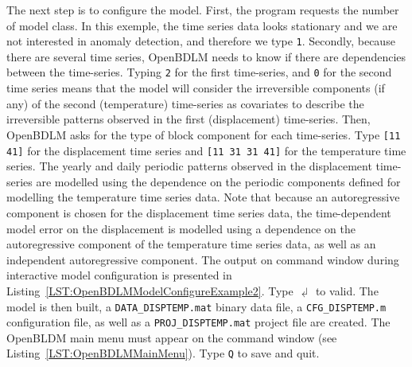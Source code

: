 The next step is to configure the model.
First, the program requests the number of model class.
In this exemple, the time series data looks stationary and we are not interested in anomaly detection, and therefore we type \colorbox{light-gray}{\lstinline[basicstyle = \mlttfamily \small, backgroundcolor = \color{light-gray}]!1!}.
Secondly, because there are several time series, OpenBDLM needs to know if there are dependencies between the time-series.
Typing \colorbox{light-gray}{\lstinline[basicstyle = \mlttfamily \small, backgroundcolor = \color{light-gray}]!2!} for the first time-series, and \colorbox{light-gray}{\lstinline[basicstyle = \mlttfamily \small, backgroundcolor = \color{light-gray}]!0!} for the second time series means that the model will consider the irreversible components (if any) of the second (temperature) time-series as covariates to describe the irreversible patterns observed in the first (displacement) time-series.
Then, OpenBDLM asks for the type of block component for each time-series. 
Type \colorbox{light-gray}{\lstinline[basicstyle = \mlttfamily \small, backgroundcolor = \color{light-gray}]![11 41]!} for the displacement time series and \colorbox{light-gray}{\lstinline[basicstyle = \mlttfamily \small, backgroundcolor = \color{light-gray}]![11 31 31 41]!} for the temperature time series.
The yearly and daily periodic patterns observed in the displacement time-series are modelled using the dependence on the periodic components defined for modelling the temperature time series data.
Note that because an autoregressive component is chosen for the displacement time series data, the time-dependent model error on the displacement is modelled using a dependence on the autoregressive component of the temperature time series data, as well as an independent autoregressive component.
The  output on \MATLAB{} command window during interactive model configuration is presented in Listing~\ref{LST:OpenBDLMModelConfigureExample2}.
Type $\dlsh$ to valid.
The model is then built, a \lstinline[basicstyle = \mlttfamily \small, backgroundcolor = \color{light-gray}]!DATA_DISPTEMP.mat! binary data file, a \lstinline[basicstyle = \mlttfamily \small, backgroundcolor = \color{light-gray}]!CFG_DISPTEMP.m! configuration file, as well as a \lstinline[basicstyle = \mlttfamily \small, backgroundcolor = \color{light-gray}]!PROJ_DISPTEMP.mat! project file are created.
The OpenBLDM main menu must appear on the \MATLAB{} command window (see Listing~\ref{LST:OpenBDLMMainMenu}).
Type \colorbox{light-gray}{\lstinline[basicstyle = \mlttfamily \small, backgroundcolor = \color{light-gray}]!Q!} to save and quit.



